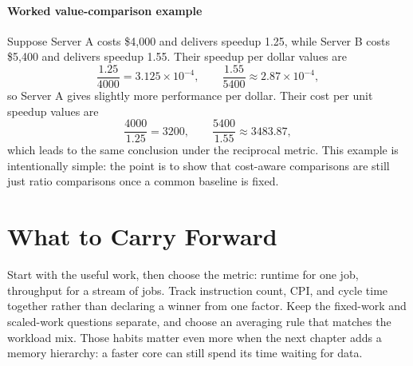 \paragraph{Worked value-comparison example}\label{par:auto-011c}
Suppose Server A costs \$4{,}000 and delivers speedup 1.25, while Server B costs \$5{,}400 and delivers speedup 1.55.
Their speedup per dollar values are
\begin{equation}\label{eq:auto-017c}
    \frac{1.25}{4000}=3.125\times 10^{-4},\qquad
    \frac{1.55}{5400}\approx 2.87\times 10^{-4},
\end{equation}
so Server A gives slightly more performance per dollar.
Their cost per unit speedup values are
\begin{equation}\label{eq:auto-017d}
    \frac{4000}{1.25}=3200,\qquad
    \frac{5400}{1.55}\approx 3483.87,
\end{equation}
which leads to the same conclusion under the reciprocal metric.
This example is intentionally simple: the point is to show that cost-aware comparisons are still just ratio comparisons once a common baseline is fixed.


\section{What to Carry Forward}\label{sec:auto-018}
Start with the useful work, then choose the metric: runtime for one job, throughput for a stream of jobs.
Track instruction count, CPI, and cycle time together rather than declaring a winner from one factor.
Keep the fixed-work and scaled-work questions separate, and choose an averaging rule that matches the workload mix.
Those habits matter even more when the next chapter adds a memory hierarchy: a faster core can still spend its time waiting for data.



